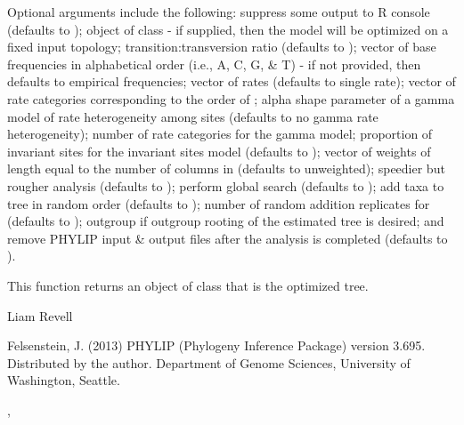 \documentclass[a4paper]{book}
\begin{document}
%
\begin{Details}\relax
Optional arguments include the following:  suppress some output to R console (defaults to );  object of class  - if supplied, then the model will be optimized on a fixed input topology;  transition:transversion ratio (defaults to );  vector of base frequencies in alphabetical order (i.e., A, C, G, \& T) - if not provided, then defaults to empirical frequencies;  vector of rates (defaults to single rate);  vector of rate categories corresponding to the order of ;  alpha shape parameter of a gamma model of rate heterogeneity among sites (defaults to no gamma rate heterogeneity);  number of rate categories for the gamma model;  proportion of invariant sites for the invariant sites model (defaults to );  vector of weights of length equal to the number of columns in  (defaults to unweighted);  speedier but rougher analysis (defaults to );  perform global search (defaults to );  add taxa to tree in random order (defaults to );  number of random addition replicates for  (defaults to );  outgroup if outgroup rooting of the estimated tree is desired; and  remove PHYLIP input \& output files after the analysis is completed (defaults to ).
\end{Details}
%
\begin{Value}
This function returns an object of class  that is the optimized tree.
\end{Value}
%
\begin{Author}\relax
Liam Revell 
\end{Author}
%
\begin{References}\relax
Felsenstein, J. (2013) PHYLIP (Phylogeny Inference Package) version 3.695. Distributed by the author. Department of Genome Sciences, University of Washington, Seattle.
\end{References}
%
\begin{SeeAlso}\relax
{}, 
\end{SeeAlso}
\end{document}
